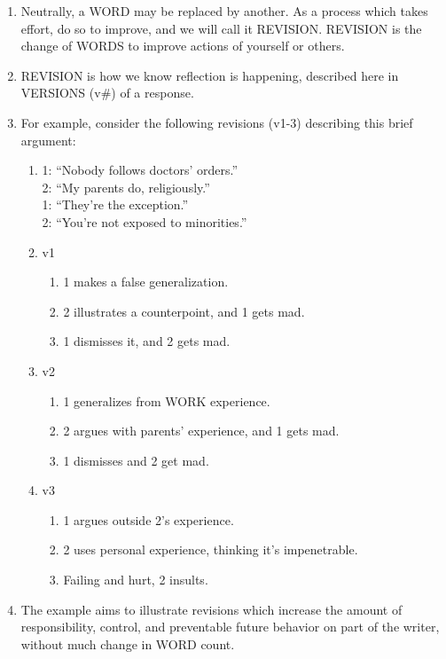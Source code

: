 \documentclass[
]{book}
\providecommand{\tightlist}{%
  \setlength{\itemsep}{0pt}\setlength{\parskip}{0pt}}
\begin{document}
\begin{enumerate}
\def\labelenumi{\arabic{enumi}.}
\item
  Neutrally, a WORD may be replaced by another. As a process which takes effort, do so to improve, and we will call it REVISION. REVISION is the change of WORDS to improve actions of yourself or others.
\item
  REVISION is how we know reflection is happening, described here in VERSIONS (v\#) of a response.
\item
  For example, consider the following revisions (v1-3) describing this brief argument:

  \begin{enumerate}
  \def\labelenumii{\arabic{enumii}.}
  \item
    1: ``Nobody follows doctors' orders.''\\
    2: ``My parents do, religiously.''\\
    1: ``They're the exception.''\\
    2: ``You're not exposed to minorities.''
  \item
    v1

    \begin{enumerate}
    \def\labelenumiii{\alph{enumiii})}
    \tightlist
    \item
      1 makes a false generalization.
    \item
      2 illustrates a counterpoint, and 1 gets mad.
    \item
      1 dismisses it, and 2 gets mad.
    \end{enumerate}
  \item
    v2

    \begin{enumerate}
    \def\labelenumiii{\alph{enumiii})}
    \tightlist
    \item
      1 generalizes from WORK experience.
    \item
      2 argues with parents' experience, and 1 gets mad.
    \item
      1 dismisses and 2 get mad.
    \end{enumerate}
  \item
    v3

    \begin{enumerate}
    \def\labelenumiii{\alph{enumiii})}
    \tightlist
    \item
      1 argues outside 2's experience.
    \item
      2 uses personal experience, thinking it's impenetrable.
    \item
      Failing and hurt, 2 insults.
    \end{enumerate}
  \end{enumerate}
\item
  The example aims to illustrate revisions which increase the amount of responsibility, control, and preventable future behavior on part of the writer, without much change in WORD count.
\end{enumerate}
\end{document}
